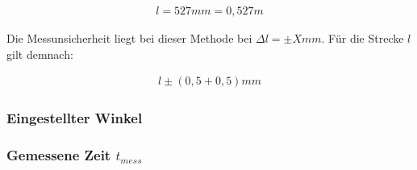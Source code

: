 \begin{align*}
    l = 527 mm = 0,527 m
\end{align*}

Die Messunsicherheit liegt bei dieser Methode bei $\Delta l = \pm X mm$. Für die Strecke $l$ gilt demnach:

\begin{align*}
    l \pm (0,5 + 0,5)mm
\end{align*}

\subsubsection{Eingestellter Winkel}

\subsubsection{Gemessene Zeit $t_{mess}$}